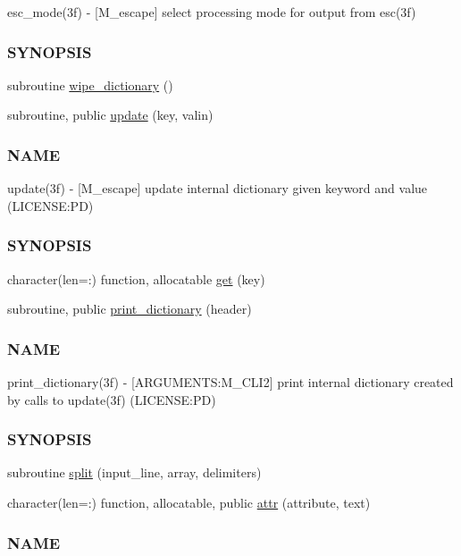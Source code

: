 \begin{DoxyCompactItemize}
\begin{DoxyCompactList}
esc\+\_\+mode(3f) -\/ \mbox{[}M\+\_\+escape\mbox{]} select processing mode for output from esc(3f) \subsubsection*{S\+Y\+N\+O\+P\+S\+IS}\end{DoxyCompactList}\item 
subroutine \mbox{\hyperlink{namespacem__escape_a1bc574bc97157fe67d868d2bd180c91e}{wipe\+\_\+dictionary}} ()
\item 
subroutine, public \mbox{\hyperlink{namespacem__escape_a5efd612f60d281003917329484a7960c}{update}} (key, valin)
\begin{DoxyCompactList}\small\item\em \subsubsection*{N\+A\+ME}

update(3f) -\/ \mbox{[}M\+\_\+escape\mbox{]} update internal dictionary given keyword and value (L\+I\+C\+E\+N\+SE\+:PD) \subsubsection*{S\+Y\+N\+O\+P\+S\+IS}\end{DoxyCompactList}\item 
character(len=\+:) function, allocatable \mbox{\hyperlink{namespacem__escape_af555c90c278ff964d8bce93ee0368a42}{get}} (key)
\item 
subroutine, public \mbox{\hyperlink{namespacem__escape_a6add907828fd34e94b87f643a5cabc64}{print\+\_\+dictionary}} (header)
\begin{DoxyCompactList}\small\item\em \subsubsection*{N\+A\+ME}

print\+\_\+dictionary(3f) -\/ \mbox{[}A\+R\+G\+U\+M\+E\+N\+TS\+:M\+\_\+\+C\+L\+I2\mbox{]} print internal dictionary created by calls to update(3f) (L\+I\+C\+E\+N\+SE\+:PD) \subsubsection*{S\+Y\+N\+O\+P\+S\+IS}\end{DoxyCompactList}\item 
subroutine \mbox{\hyperlink{namespacem__escape_af23bd97702864e0f32258e6ec0d51506}{split}} (input\+\_\+line, array, delimiters)
\item 
character(len=\+:) function, allocatable, public \mbox{\hyperlink{namespacem__escape_a916b16ce9be553d669f54cb9575a91be}{attr}} (attribute, text)
\begin{DoxyCompactList}\small\item\em \subsubsection*{N\+A\+ME}


\end{DoxyCompactList}
\end{DoxyCompactItemize}
